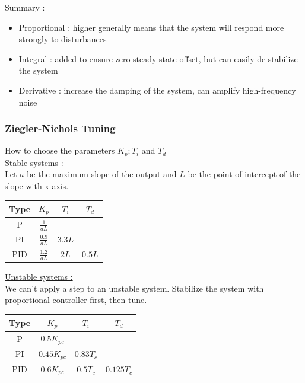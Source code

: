 \documentclass[../main.tex]{subfiles}
\begin{document}
Summary : \begin{itemize}
    \item Proportional : higher generally means that the system will respond more strongly to disturbances\\
    \item Integral : added to ensure zero steady-state offset, but can easily de-stabilize the system\\
    \item Derivative : increase the damping of the system, can amplify high-frequency noise\\
\end{itemize}

\subsubsection{Ziegler-Nichols Tuning}
How to choose the parameters $K_p; T_i$ and $T_d$\\

\quad \underline{Stable systems :}\\
Let $a$ be the maximum slope of the output and $L$ be the point of intercept of the slope with x-axis.\\

\begin{table}[hbt!]
    \centering
    \begin{tabular}{|c|c|c|c|}
    \hline
        Type & $K_p$ & $T_i$ & $T_d$ \\
        \hline
        P & $\frac{1}{aL}$ & & \\
        \hline
        PI & $\frac{0.9}{aL}$ & $3.3L$ & \\
        \hline
        PID & $\frac{1.2}{aL}$ & $2L$ & $0.5L$\\
        \hline
    \end{tabular}
\end{table}

\quad \underline{Unstable systems :}\\
We can't apply a step to an unstable system. Stabilize the system with proportional controller first, then tune.\\

\begin{table}[hbt!]
    \centering
    \begin{tabular}{|c|c|c|c|}
        \hline
        Type & $K_p$ & $T_i$ & $T_d$ \\
        \hline
        P & $0.5 K_{pc}$ & & \\
        \hline
        PI & $0.45K_{pc}$ & $0.83 T_c$ & \\
        \hline
        PID & $0.6K_{pc}$ & $0.5T_c$ & $0.125T_c$\\
        \hline
    \end{tabular}
\end{table}
\end{document}
